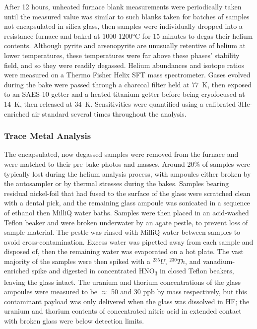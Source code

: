After 12 hours, unheated furnace blank measurements were periodically taken until the measured value was similar to such blanks 
taken for batches of samples not encapsulated in silica glass, then samples were individually dropped into a resistance furnace and baked at 1000-1200°C for 15 minutes to degas their helium contents. 
Although pyrite and arsenopyrite are unusually retentive of helium at lower temperatures, these temperatures were far above these phases' stability field, and so they were readily degassed. 
Helium abundances and isotope ratios were measured on a Thermo Fisher Helix SFT mass spectrometer. Gases evolved during the bake were passed through a charcoal filter held at 77~K, then exposed to an SAES-10 getter and a heated 
titanium getter before being cryofocused at 14~K, then released at 34~K. Sensitivities were quantified using a calibrated 3He-enriched air standard several times throughout the analysis.

\subsubsection{Trace Metal Analysis}
The encapsulated, now degassed samples were removed from the furnace and were matched to their pre-bake photos and masses. Around 20\% of samples were typically lost during the helium analysis process,
with ampoules either broken by the autosampler or by thermal stresses during the bakes. Samples bearing residual nickel-foil that had fused to the surface of the glass were scratched clean with a dental pick,
and the remaining glass ampoule was sonicated in a sequence of ethanol then MilliQ water baths. Samples were then placed in an acid-washed Teflon beaker and were broken underwater by an agate pestle, to prevent 
loss of sample material. The pestle was rinsed with MilliQ water between samples to avoid cross-contamination. Excess water was pipetted away from each sample and disposed of, then the remaining water was evaporated on a hot plate.
The vast majority of the samples were then spiked with a $^{235}U$, $^{230}Th$, and vanadium-enriched spike and digested in concentrated HNO\textsubscript{3} in closed Teflon beakers, leaving the glass intact. 
The uranium and thorium concentrations of the glass ampoules were measured to be $\approx$ 50 and 30 ppb by mass respectively, but this contaminant payload was only delivered when the glass was dissolved in HF; 
the uranium and thorium contents of concentrated nitric acid in extended contact with broken glass were below detection limits. 

